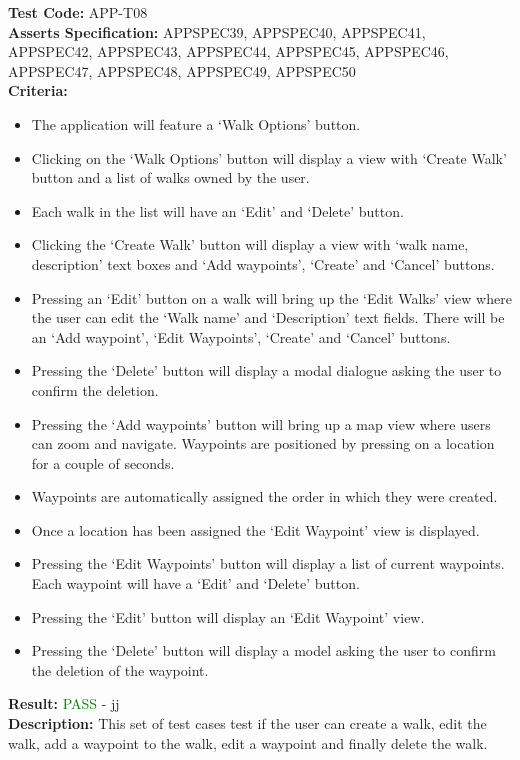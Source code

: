 \documentclass[11pt,a4paper]{report}
\begin{document}
\label{test:APP-T08}
\noindent\textbf{Test Code:} APP-T08\\
\textbf{Asserts Specification:} APPSPEC39, APPSPEC40, APPSPEC41, APPSPEC42, APPSPEC43, APPSPEC44, APPSPEC45, APPSPEC46, APPSPEC47, APPSPEC48, APPSPEC49, APPSPEC50\\ 
\textbf{Criteria:} \begin{itemize}
                     \item The application will feature a `Walk Options' button.
                     \item Clicking on the `Walk Options' button will display a view with `Create Walk' button and a list of walks owned by the user.
                     \item Each walk in the list will have an `Edit' and `Delete' button.
                     \item Clicking the `Create Walk' button will display a view with `walk name, description' text boxes and `Add waypoints', `Create' and `Cancel' buttons.
                     \item Pressing an `Edit' button on a walk will bring up the `Edit Walks' view where the user can edit the `Walk name' and `Description' text fields. There will be an `Add waypoint', `Edit Waypoints', `Create' and `Cancel' buttons.
                     \item Pressing the `Delete' button will display a modal dialogue asking the user to confirm the deletion.
                     \item Pressing the `Add waypoints' button will bring up a map view where users can zoom and navigate. Waypoints are positioned by pressing on a location for a couple of seconds.
                     \item Waypoints are automatically assigned the order in which they were created.
                     \item Once a location has been assigned the `Edit Waypoint' view is displayed.
                     \item Pressing the `Edit Waypoints' button will display a list of current waypoints. Each waypoint will have a `Edit' and `Delete' button.
                     \item Pressing the `Edit' button will display an `Edit Waypoint' view.
                     \item Pressing the `Delete' button will display a model asking the user to confirm the deletion of the waypoint.
                     
                   \end{itemize}
\textbf{Result:} \textcolor{green}{PASS} - jj\\
\textbf{Description:} This set of test cases test if the user can create a walk, edit the walk, add a waypoint to the walk, edit a waypoint and finally delete the walk. \\
\end{document}
